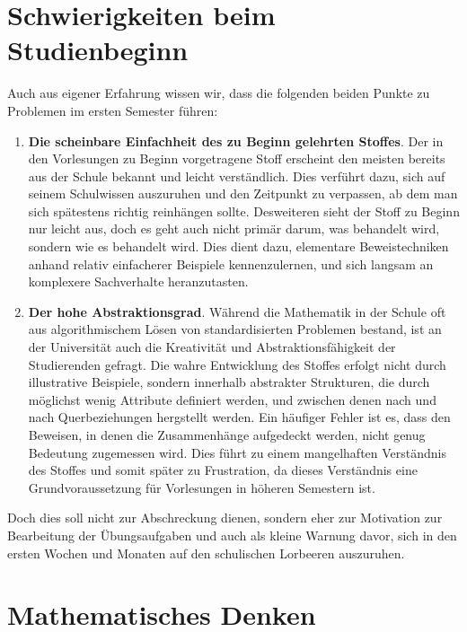 \section{Schwierigkeiten beim Studienbeginn}
Auch aus eigener Erfahrung wissen wir, dass die folgenden beiden Punkte zu Problemen im ersten
Semester führen:
\begin{enumerate}
    \item
    \textbf{Die scheinbare Einfachheit des zu Beginn gelehrten Stoffes}. 
    Der in den Vorlesungen zu Beginn vorgetragene Stoff erscheint den meisten bereits aus der Schule bekannt 
    und leicht verständlich. Dies verführt dazu, sich auf seinem Schulwissen auszuruhen und den Zeitpunkt zu verpassen, 
    ab dem man sich spätestens richtig reinhängen sollte. Desweiteren sieht der Stoff zu Beginn nur leicht aus, doch es geht 
    auch nicht primär darum, was behandelt wird, sondern wie es behandelt wird. Dies dient dazu, elementare Beweistechniken
    anhand relativ einfacherer Beispiele kennenzulernen, und sich langsam an komplexere Sachverhalte heranzutasten. 
    \item
    \textbf{Der hohe Abstraktionsgrad}. Während die Mathematik in der Schule oft aus algorithmischem Lösen von standardisierten 
    Problemen bestand, ist an der Universität auch die Kreativität und Abstraktionsfähigkeit der Studierenden gefragt.
    Die wahre Entwicklung des Stoffes erfolgt nicht durch illustrative Beispiele, sondern innerhalb abstrakter Strukturen, die durch 
    möglichst wenig Attribute definiert werden, und zwischen denen nach und nach Querbeziehungen hergstellt werden. 
    Ein häufiger Fehler ist es, dass den Beweisen, in denen die Zusammenhänge aufgedeckt werden, nicht genug Bedeutung zugemessen wird.
    Dies führt zu einem mangelhaften Verständnis des Stoffes und somit später zu Frustration, da dieses Verständnis eine Grundvoraussetzung 
    für Vorlesungen in höheren Semestern ist. 
\end{enumerate}
Doch dies soll nicht zur Abschreckung dienen, sondern eher zur Motivation zur Bearbeitung der Übungsaufgaben und auch als kleine Warnung davor, 
sich in den ersten Wochen und Monaten auf den schulischen Lorbeeren auszuruhen. 

\section{Mathematisches Denken}

